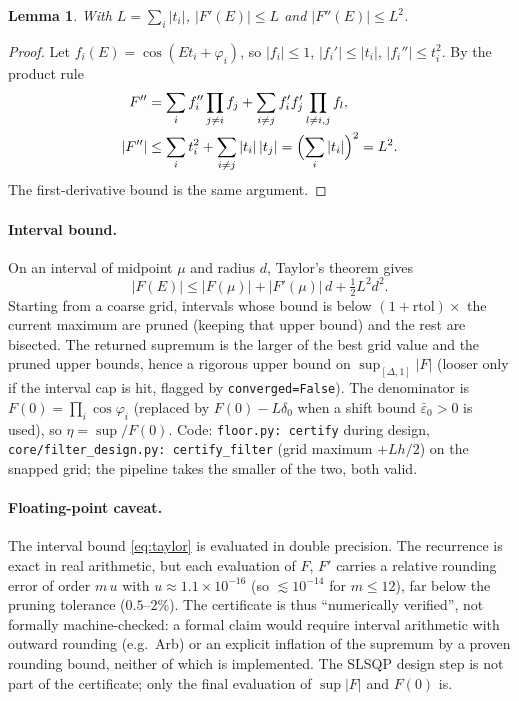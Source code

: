 \documentclass[11pt]{article}
\newtheorem{lemma}{Lemma}
\theoremstyle{definition}
\newcommand{\abs}[1]{\left\lvert #1\right\rvert}
\newcommand{\code}[1]{\texttt{#1}}
\begin{document}
\begin{lemma}\label{lem:F2}
With $L=\sum_i\abs{t_i}$, $\abs{F'(E)}\le L$ and $\abs{F''(E)}\le L^2$.
\end{lemma}
\begin{proof}
Let $f_i(E)=\cos(Et_i+\varphi_i)$, so $\abs{f_i}\le1$, $\abs{f_i'}\le\abs{t_i}$, $\abs{f_i''}\le t_i^2$. By the product rule
\begin{align*}
  F''&=\sum_i f_i''\prod_{j\ne i}f_j+\sum_{i\ne j}f_i'f_j'\prod_{l\ne i,j}f_l,\\
  \abs{F''}&\le\sum_i t_i^2+\sum_{i\ne j}\abs{t_i}\abs{t_j}=\Bigl(\sum_i\abs{t_i}\Bigr)^2=L^2 .
\end{align*}
The first-derivative bound is the same argument.
\end{proof}

\paragraph{Interval bound.} On an interval of midpoint $\mu$ and radius $d$, Taylor's theorem gives
\begin{equation}\label{eq:taylor}
  \abs{F(E)}\le\abs{F(\mu)}+\abs{F'(\mu)}\,d+\tfrac12L^2d^2 .
\end{equation}
Starting from a coarse grid, intervals whose bound is below $(1+\mathrm{rtol})\times$ the current maximum are pruned
(keeping that upper bound) and the rest are bisected. The returned supremum is the larger of the best grid value and the
pruned upper bounds, hence a rigorous upper bound on $\sup_{[\Delta,1]}\abs F$ (looser only if the interval cap is hit,
flagged by \code{converged=False}). The denominator is $F(0)=\prod_i\cos\varphi_i$ (replaced by $F(0)-L\delta_0$ when a shift bound $\bar\varepsilon_0>0$ is used), so
$\eta=\sup/F(0)$. Code: \code{floor.py: certify} during design, \code{core/filter\_design.py: certify\_filter} (grid maximum
$+Lh/2$) on the snapped grid; the pipeline takes the smaller of the two, both valid.

\paragraph{Floating-point caveat.} The interval bound \eqref{eq:taylor} is evaluated in double precision. The recurrence is
exact in real arithmetic, but each evaluation of $F$, $F'$ carries a relative rounding error of order $m\,u$ with $u\approx1.1\times10^{-16}$
(so $\lesssim10^{-14}$ for $m\le12$), far below the pruning tolerance ($0.5$--$2\%$). The certificate is thus ``numerically verified'', not formally
machine-checked: a formal claim would require interval arithmetic with outward rounding (e.g.\ Arb) or an explicit inflation of the supremum by
a proven rounding bound, neither of which is implemented. The SLSQP design step is not part of the certificate; only the final evaluation of
$\sup\abs F$ and $F(0)$ is.
\end{document}
